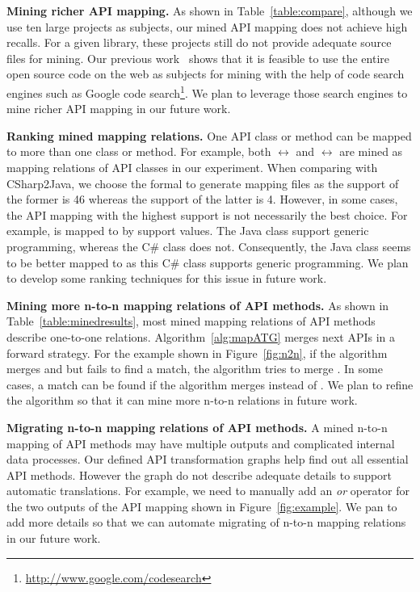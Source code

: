 \textbf{Mining richer API mapping.} As shown in
Table~\ref{table:compare}, although we use ten large projects as
subjects, our mined API mapping does not achieve high recalls. For a
given library, these projects still do not provide adequate source
files for mining. Our previous
work~\cite{thummalapenta07parseweb,thummalapentaase08spotweb} shows
that it is feasible to use the entire open source code on the web as
subjects for mining with the help of code search engines such as
Google code search\footnote{\url{http://www.google.com/codesearch}}.
We plan to leverage those search engines to mine richer API mapping
in our future work.

\textbf{Ranking mined mapping relations.} One API class or method
can be mapped to more than one class or method. For example, both
$\leftrightarrow$ 
and $\leftrightarrow$
 are mined as mapping relations of API classes
in our experiment. When comparing with CSharp2Java, we choose the
formal to generate mapping files as the support of the former is 46
whereas the support of the latter is 4. However, in some cases, the
API mapping with the highest support is not necessarily the best
choice. For example,  is mapped to
 by support values. The Java
class support generic programming, whereas the C\# class does not.
Consequently, the Java class seems to be better mapped to
 as this C\# class supports
generic programming. We plan to develop some ranking techniques for
this issue in future work.



\textbf{Mining more n-to-n mapping relations of API methods.} As
shown in Table~\ref{table:minedresults}, most mined mapping
relations of API methods describe one-to-one relations.
Algorithm~\ref{alg:mapATG} merges next APIs in a forward strategy.
For the example shown in Figure~\ref{fig:n2n}, if the algorithm
merges  and  but fails to find a
match, the algorithm tries to merge . In some
cases, a match can be found if the algorithm merges
 instead of . We plan to refine
the algorithm so that it can mine more n-to-n relations in future
work.

\textbf{Migrating n-to-n mapping relations of API methods.} A mined
n-to-n mapping of API methods may have multiple outputs and
complicated internal data processes. Our defined API transformation
graphs help find out all essential API methods. However the graph do
not describe adequate details to support automatic translations. For
example, we need to manually add an \emph{or} operator for the two
outputs of the API mapping shown in Figure~\ref{fig:example}. We pan
to add more details so that we can automate migrating of n-to-n
mapping relations in our future work.

